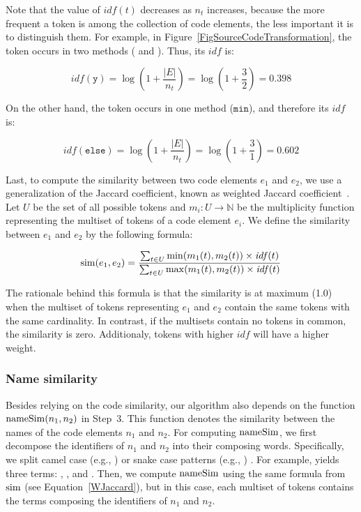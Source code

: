 Note that the value of $\mathit{idf}(t)$ decreases as $n_t$ increases, because the more frequent a token is among the collection of code elements, the less important it is to distinguish them.
For example, in Figure~\ref{FigSourceCodeTransformation}, the token  occurs in two methods ( and ). Thus, its $\mathit{idf}$ is:

\[
\mathit{idf}(\mathtt{y}) = 
\log (1 + \frac{|E|}{n_t}) = 
\log (1 + \frac{3}{2}) = 0.398
\]

On the other hand, the token  occurs in one method ($\mathtt{min}$), and therefore its $\mathit{idf}$ is:

\[
\mathit{idf}(\mathtt{else}) = 
\log (1 + \frac{|E|}{n_t}) = 
\log (1 + \frac{3}{1}) = 0.602
\]

Last, to compute the similarity between two code elements $e_1$ and $e_2$, we use a generalization of the Jaccard coefficient, known as weighted Jaccard coefficient~\cite{chierichetti2010finding}.
Let $U$ be the set of all possible tokens and $m_i: U \to \mathbb{N}$ be the multiplicity function representing the multiset of tokens of a code element $e_i$.
We define the similarity between $e_1$ and $e_2$ by the following formula:


\begin{align}
\label{WJaccard}
\rdsim(e_1, e_2) = \frac{\sum_{t \in U} \min(m_1(t), m_2(t)) \times \mathit{idf}(t) }
                        {\sum_{t \in U} \max(m_1(t), m_2(t)) \times \mathit{idf}(t) }
\end{align}

The rationale behind this formula is that the similarity is at maximum (1.0) when the multiset of tokens representing $e_1$ and $e_2$ contain the same tokens with the same cardinality. In contrast, if the multisets contain no tokens in common, the similarity is zero. Additionaly, tokens with higher $\mathit{idf}$ will have a higher weight.


\subsubsection{Name similarity}
\label{SecNameSim}

Besides relying on the code similarity, our algorithm also depends on the function $\operatorname{nameSim}(n_1, n_2)$ in Step~3.
This function denotes the similarity between the names of the code elements $n_1$ and $n_2$.
For computing $\operatorname{nameSim}$, we first decompose the identifiers of $n_1$ and $n_2$ into their composing words. Specifically, we split camel case (e.g., ) or snake case patterns (e.g., ) . For example,  yields three terms: , , and .
Then, we compute $\operatorname{nameSim}$ using the same formula from $\operatorname{sim}$ (see Equation~\ref{WJaccard}), but in this case, each multiset of tokens contains the terms composing the identifiers of $n_1$ and $n_2$.


